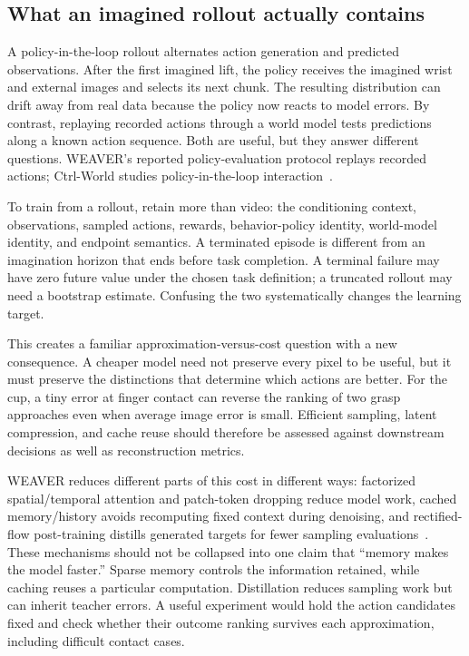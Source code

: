 \subsection{What an imagined rollout actually contains}
A policy-in-the-loop rollout alternates action generation and predicted observations. After the first imagined lift, the policy receives the imagined wrist and external images and selects its next chunk. The resulting distribution can drift away from real data because the policy now reacts to model errors. By contrast, replaying recorded actions through a world model tests predictions along a known action sequence. Both are useful, but they answer different questions. WEAVER's reported policy-evaluation protocol replays recorded actions; Ctrl-World studies policy-in-the-loop interaction~\citep{weaver,ctrl}.

To train from a rollout, retain more than video: the conditioning context, observations, sampled actions, rewards, behavior-policy identity, world-model identity, and endpoint semantics. A terminated episode is different from an imagination horizon that ends before task completion. A terminal failure may have zero future value under the chosen task definition; a truncated rollout may need a bootstrap estimate. Confusing the two systematically changes the learning target.

This creates a familiar approximation-versus-cost question with a new consequence. A cheaper model need not preserve every pixel to be useful, but it must preserve the distinctions that determine which actions are better. For the cup, a tiny error at finger contact can reverse the ranking of two grasp approaches even when average image error is small. Efficient sampling, latent compression, and cache reuse should therefore be assessed against downstream decisions as well as reconstruction metrics.

WEAVER reduces different parts of this cost in different ways: factorized spatial/temporal attention and patch-token dropping reduce model work, cached memory/history avoids recomputing fixed context during denoising, and rectified-flow post-training distills generated targets for fewer sampling evaluations~\citep{weaver}. These mechanisms should not be collapsed into one claim that ``memory makes the model faster.'' Sparse memory controls the information retained, while caching reuses a particular computation. Distillation reduces sampling work but can inherit teacher errors. A useful experiment would hold the action candidates fixed and check whether their outcome ranking survives each approximation, including difficult contact cases.

